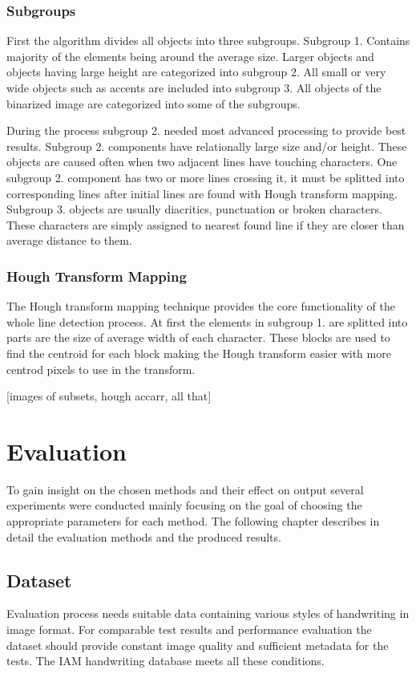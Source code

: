\documentclass{article}
\begin{document}
          \subsubsection{Subgroups}
            First the algorithm divides all objects into three subgroups. Subgroup 1. Contains majority of the elements being around the average size. Larger objects and objects having large height are categorized into subgroup 2. All small or very wide objects such as accents are included into subgroup 3. All objects of the binarized image are categorized into some of the subgroups.

            During the process subgroup 2. needed most advanced processing to provide best results. Subgroup 2. components have relationally large size and/or height. These objects are caused often when two adjacent lines have touching characters. One subgroup 2. component has two or more lines crossing it, it must be splitted into corresponding lines after initial lines are found with Hough transform mapping. Subgroup 3. objects are usually diacritics, punctuation or broken characters. These characters are simply assigned to nearest found line if they are closer than average distance to them.

          \subsubsection{Hough Transform Mapping}
            The Hough transform mapping technique provides the core functionality of the whole line detection process. At first the elements in subgroup 1. are splitted into parts are the size of average width of each character. These blocks are used to find the centroid for each block making the Hough transform easier with more centrod pixels to use in the transform.


          {\color{red}[images of subsets, hough accarr, all that]}



  \newpage
  \section{Evaluation}
    To gain insight on the chosen methods and their effect on output several experiments were conducted mainly focusing on the goal of choosing the appropriate parameters for each method. The following chapter describes in detail the evaluation methods and the produced results.

  \subsection{Dataset}
    Evaluation process needs suitable data containing various styles of handwriting in image format. For comparable test results and performance evaluation the dataset should provide constant image quality and sufficient metadata for the tests. The IAM handwriting database meets all these conditions.
\end{document}
